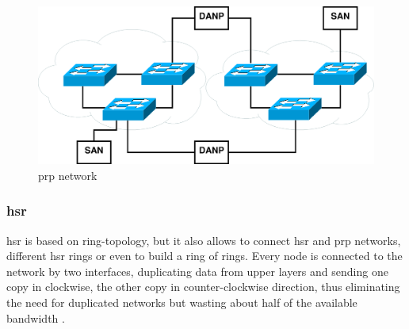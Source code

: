 \begin{figure}
    \centering
    \includegraphics[width=1\textwidth]{figures/prp.eps}
    \caption{\gls{prp} network}
    \label{fig:prp}
\end{figure}

\subsubsection{\gls{hsr}}
\gls{hsr} is based on ring-topology, but it also allows to connect \gls{hsr} and \gls{prp} networks, different \gls{hsr} rings or even to build a ring of rings. 
Every node is connected to the network by two interfaces, duplicating data from upper layers and sending one copy in clockwise, the other copy in counter-clockwise direction,
thus eliminating the need for duplicated networks but wasting about half of the available bandwidth \cite{6174793}. 
\\


